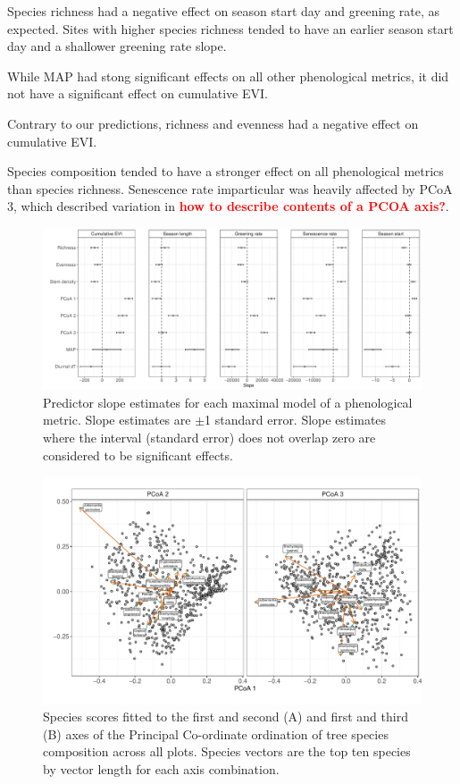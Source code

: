 \documentclass[11pt,a4paper]{article}
\newcommand{\todo}[1]{\textcolor{red}{\textbf{#1}}}   %
\begin{document}
Species richness had a negative effect on season start day and greening rate, as expected. Sites with higher species richness tended to have an earlier season start day and a shallower greening rate slope. 

While MAP had stong significant effects on all other phenological metrics, it did not have a significant effect on cumulative EVI.

Contrary to our predictions, richness and evenness had a negative effect on cumulative EVI.

Species composition tended to have a stronger effect on all phenological metrics than species richness. Senescence rate imparticular was heavily affected by PCoA 3, which described variation in \todo{how to describe contents of a PCOA axis?}.



 

\begin{figure}[H]
\centering
	\includegraphics[width=\textwidth]{mod_spamm_slopes.pdf}
	\caption{Predictor slope estimates for each maximal model of a phenological metric. Slope estimates are $\pm$1 standard error. Slope estimates where the interval (standard error) does not overlap zero are considered to be significant effects.}
	\label{mod_spamm_slopes}
\end{figure}

\begin{figure}[H]
\centering
	\includegraphics[width=\textwidth]{pcoa.pdf}
	\caption{Species scores fitted to the first and second (A) and first and third (B) axes of the Principal Co-ordinate ordination of tree species composition across all plots. Species vectors are the top ten species by vector length for each axis combination.}
	\label{pcoa}
\end{figure}
\end{document}
